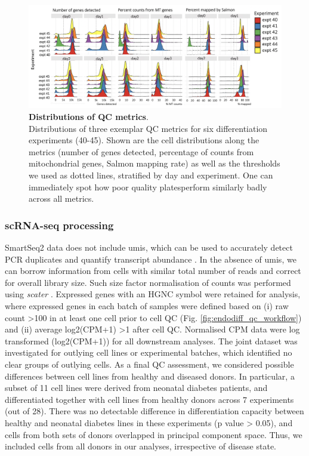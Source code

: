 \begin{figure}[h]
\centering
\includegraphics[width=16cm]{Chapter4/Fig/endodiff_qc_examples.png}
\caption[Distributions of QC metrics]{\textbf{Distributions of QC metrics}.\\
Distributions of three exemplar QC metrics for six differentiation experiments (40-45).
Shown are the cell distributions along the metrics (number of genes detected, percentage of counts from mitochondrial genes, Salmon \cite{patro2017salmon} mapping rate) as well as the thresholds we used as dotted lines, stratified by day and experiment.
One can immediately spot how poor quality plates\footnotemark perform similarly badly across all metrics.}
\label{fig:endodiff_qc_distributions}
\end{figure}

\subsubsection{scRNA-seq processing}

SmartSeq2 data does not include \gls{umis}, which can be used to accurately detect PCR duplicates and quantify transcript abundance \cite{smith2017umi, islam2014quantitative, kivioja2012counting}. 
In the absence of \gls{umis}, we can borrow information from cells with similar total number of reads and correct for overall library size. 
Such size factor normalisation of counts was performed using \textit{scater} \cite{mccarthy2017scater}.
Expressed genes with an HGNC symbol were retained for analysis, where expressed genes in each batch of samples were defined based on (i) raw count >100 in at least one cell prior to cell QC (Fig. \ref{fig:endodiff_qc_workflow}) and (ii) average log2(CPM+1) >1 after cell QC. 
Normalised CPM data were log transformed (log2(CPM+1)) for all downstream analyses. 
The joint dataset was investigated for outlying cell lines or experimental batches, which identified no clear groups of outlying cells. 
As a final QC assessment, we considered possible differences between cell lines from healthy and diseased donors. 
In particular, a subset of 11 cell lines were derived from neonatal diabetes patients, and differentiated together with cell lines from healthy donors across 7 experiments (out of 28). 
There was no detectable difference in differentiation capacity between healthy and neonatal diabetes lines in these experiments (p value > 0.05), and cells from both sets of donors overlapped in principal component space. 
Thus, we included cells from all donors in our analyses, irrespective of disease state.



